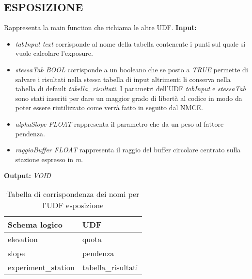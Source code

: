 \subsection{\textbf{ESPOSIZIONE}}
Rappresenta la main function che richiama le altre UDF. \newline
\textbf{Input:}
\begin{itemize}
\item \textit{tabInput text} corrisponde al nome della tabella contenente i punti sul quale si vuole calcolare l'exposure. 
\item \textit{stessaTab BOOL} corrisponde a un booleano che se posto a \textit{TRUE} permette di salvare i risultati nella stessa tabella di input altrimenti li conserva nella tabella di default \textit{tabella\_risultati}. I parametri dell'UDF \textit{tabInput} e \textit{stessaTab} sono stati inseriti per dare un maggior grado di libertà al codice in modo da poter essere riutilizzato come verrà fatto in seguito dal NMCE. 
\item \textit{alphaSlope FLOAT} rappresenta il parametro che da un peso al fattore pendenza.
\item \textit{raggioBuffer FLOAT } rappresenta il raggio del buffer circolare centrato sulla stazione espresso in \textit{m}.
\end{itemize}
\textbf{Output:} \textit{VOID} 

\begin{table}[h]
\centering
\caption{Tabella di corrispondenza dei nomi per l'UDF esposizione}
\label{mapTb3}
\begin{tabular}{|l|l|}
\hline
Schema logico       & UDF                \\ \hline
elevation           & quota              \\
slope               & pendenza           \\
experiment\_station & tabella\_risultati \\ \hline
\end{tabular}
\end{table}

